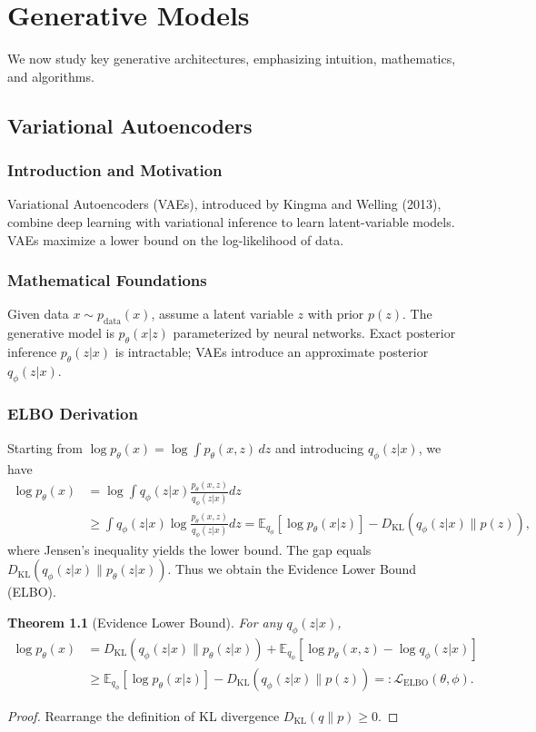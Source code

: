 \documentclass[11pt]{book}
\newtheorem{theorem}{Theorem}[chapter]
\begin{document}
\chapter{Generative Models}
We now study key generative architectures, emphasizing intuition, mathematics, and algorithms.

\section{Variational Autoencoders}
\subsection{Introduction and Motivation}
Variational Autoencoders (VAEs), introduced by Kingma and Welling (2013), combine deep learning with variational inference to learn latent-variable models. VAEs maximize a lower bound on the log-likelihood of data.

\subsection{Mathematical Foundations}
Given data $x\sim p_\text{data}(x)$, assume a latent variable $z$ with prior $p(z)$. The generative model is $p_\theta(x|z)$ parameterized by neural networks. Exact posterior inference $p_\theta(z|x)$ is intractable; VAEs introduce an approximate posterior $q_\phi(z|x)$.

\subsection{ELBO Derivation}
Starting from $\log p_\theta(x)=\log \int p_\theta(x,z)\, dz$ and introducing $q_\phi(z|x)$, we have
\begin{align}
\log p_\theta(x) &= \log \int q_\phi(z|x) \frac{p_\theta(x,z)}{q_\phi(z|x)} dz \\ 
&\ge \int q_\phi(z|x) \log \frac{p_\theta(x,z)}{q_\phi(z|x)} dz = \mathbb{E}_{q_\phi}[\log p_\theta(x|z)] - D_{\mathrm{KL}}(q_\phi(z|x)\|p(z)),
\end{align}
where Jensen's inequality yields the lower bound. The gap equals $D_{\mathrm{KL}}(q_\phi(z|x)\|p_\theta(z|x))$. Thus we obtain the Evidence Lower Bound (ELBO).

\begin{theorem}[Evidence Lower Bound]
For any $q_\phi(z|x)$,
\begin{align}
\log p_\theta(x) &= D_{\mathrm{KL}}(q_\phi(z|x)\|p_\theta(z|x)) + \mathbb{E}_{q_\phi} [\log p_\theta(x,z) - \log q_\phi(z|x)] \\
&\ge \mathbb{E}_{q_\phi} [\log p_\theta(x|z)] - D_{\mathrm{KL}}(q_\phi(z|x)\|p(z)) =: \mathcal{L}_{\text{ELBO}}(\theta,\phi).
\end{align}
\end{theorem}
\begin{proof}
Rearrange the definition of KL divergence $D_{\mathrm{KL}}(q\|p)\ge0$.
\end{proof}
\end{document}
